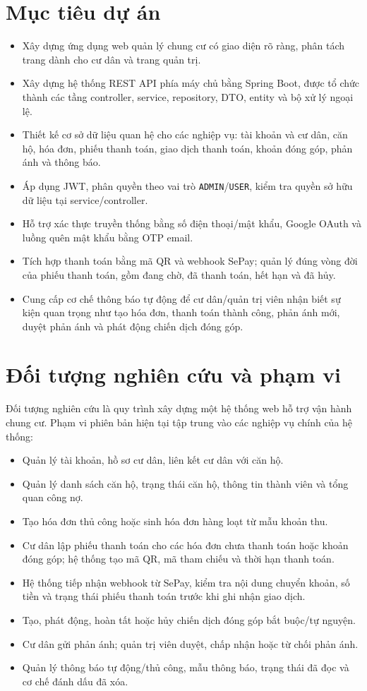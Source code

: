 ﻿\documentclass[12pt,a4paper]{report}
\begin{document}
\section{Mục tiêu dự án}
\begin{itemize}
  \item Xây dựng ứng dụng web quản lý chung cư có giao diện rõ ràng, phân tách trang dành cho cư dân và trang quản trị.
  \item Xây dựng hệ thống REST API phía máy chủ bằng Spring Boot, được tổ chức thành các tầng controller, service, repository, DTO, entity và bộ xử lý ngoại lệ.
  \item Thiết kế cơ sở dữ liệu quan hệ cho các nghiệp vụ: tài khoản và cư dân, căn hộ, hóa đơn, phiếu thanh toán, giao dịch thanh toán, khoản đóng góp, phản ánh và thông báo.
  \item Áp dụng JWT, phân quyền theo vai trò \texttt{ADMIN}/\texttt{USER}, kiểm tra quyền sở hữu dữ liệu tại service/controller.
  \item Hỗ trợ xác thực truyền thống bằng số điện thoại/mật khẩu, Google OAuth và luồng quên mật khẩu bằng OTP email.
  \item Tích hợp thanh toán bằng mã QR và webhook SePay; quản lý đúng vòng đời của phiếu thanh toán, gồm đang chờ, đã thanh toán, hết hạn và đã hủy.
  \item Cung cấp cơ chế thông báo tự động để cư dân/quản trị viên nhận biết sự kiện quan trọng như tạo hóa đơn, thanh toán thành công, phản ánh mới, duyệt phản ánh và phát động chiến dịch đóng góp.
\end{itemize}

\section{Đối tượng nghiên cứu và phạm vi}
Đối tượng nghiên cứu là quy trình xây dựng một hệ thống web hỗ trợ vận hành chung cư. Phạm vi phiên bản hiện tại tập trung vào các nghiệp vụ chính của hệ thống:
\begin{itemize}
  \item Quản lý tài khoản, hồ sơ cư dân, liên kết cư dân với căn hộ.
  \item Quản lý danh sách căn hộ, trạng thái căn hộ, thông tin thành viên và tổng quan công nợ.
  \item Tạo hóa đơn thủ công hoặc sinh hóa đơn hàng loạt từ mẫu khoản thu.
  \item Cư dân lập phiếu thanh toán cho các hóa đơn chưa thanh toán hoặc khoản đóng góp; hệ thống tạo mã QR, mã tham chiếu và thời hạn thanh toán.
  \item Hệ thống tiếp nhận webhook từ SePay, kiểm tra nội dung chuyển khoản, số tiền và trạng thái phiếu thanh toán trước khi ghi nhận giao dịch.
  \item Tạo, phát động, hoàn tất hoặc hủy chiến dịch đóng góp bắt buộc/tự nguyện.
  \item Cư dân gửi phản ánh; quản trị viên duyệt, chấp nhận hoặc từ chối phản ánh.
  \item Quản lý thông báo tự động/thủ công, mẫu thông báo, trạng thái đã đọc và cơ chế đánh dấu đã xóa.
\end{itemize}
\end{document}
